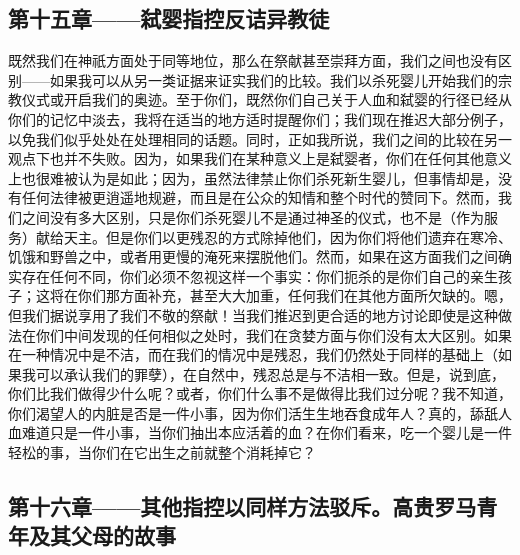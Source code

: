 \subsection{第十五章——弑婴指控反诘异教徒}

既然我们在神祇方面处于同等地位，那么在祭献甚至崇拜方面，我们之间也没有区别——如果我可以从另一类证据来证实我们的比较。我们以杀死婴儿开始我们的宗教仪式或开启我们的奥迹。至于你们，既然你们自己关于人血和弑婴的行径已经从你们的记忆中淡去，我将在适当的地方适时提醒你们；我们现在推迟大部分例子，以免我们似乎处处在处理相同的话题。同时，正如我所说，我们之间的比较在另一观点下也并不失败。因为，如果我们在某种意义上是弑婴者，你们在任何其他意义上也很难被认为是如此；因为，虽然法律禁止你们杀死新生婴儿，但事情却是，没有任何法律被更逍遥地规避，而且是在公众的知情和整个时代的赞同下。然而，我们之间没有多大区别，只是你们杀死婴儿不是通过神圣的仪式，也不是（作为服务）献给天主。但是你们以更残忍的方式除掉他们，因为你们将他们遗弃在寒冷、饥饿和野兽之中，或者用更慢的淹死来摆脱他们。然而，如果在这方面我们之间确实存在任何不同，你们必须不忽视这样一个事实：你们扼杀的是你们自己的亲生孩子；这将在你们那方面补充，甚至大大加重，任何我们在其他方面所欠缺的。嗯，但我们据说享用了我们不敬的祭献！当我们推迟到更合适的地方讨论即使是这种做法在你们中间发现的任何相似之处时，我们在贪婪方面与你们没有太大区别。如果在一种情况中是不洁，而在我们的情况中是残忍，我们仍然处于同样的基础上（如果我可以承认我们的罪孽），在自然中，残忍总是与不洁相一致。但是，说到底，你们比我们做得少什么呢？或者，你们什么事不是做得比我们过分呢？我不知道，你们渴望人的内脏是否是一件小事，因为你们活生生地吞食成年人？真的，舔舐人血难道只是一件小事，当你们抽出本应活着的血？在你们看来，吃一个婴儿是一件轻松的事，当你们在它出生之前就整个消耗掉它？\par


\subsection{第十六章——其他指控以同样方法驳斥。高贵罗马青年及其父母的故事}

